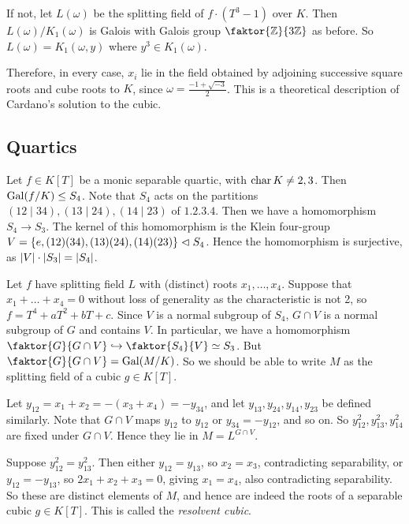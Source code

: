 If not, let \( L(\omega) \) be the splitting field of \( f \cdot (T^3 - 1) \) over \( K \).
Then \( L(\omega) / K_1(\omega) \) is Galois with Galois group \( \faktor{\mathbb Z}{3\mathbb Z} \) as before.
So \( L(\omega) = K_1(\omega, y) \) where \( y^3 \in K_1(\omega) \).

Therefore, in every case, \( x_i \) lie in the field obtained by adjoining successive square roots and cube roots to \( K \), since \( \omega = \frac{-1 + \sqrt{-3}}{2} \).
This is a theoretical description of Cardano's solution to the cubic.

\subsection{Quartics}
Let \( f \in K[T] \) be a monic separable quartic, with \( \operatorname{char} K \neq 2, 3 \).
Then \( \operatorname{Gal}(f/K) \leq S_4 \).
Note that \( S_4 \) acts on the partitions \( (12\mid 34), (13\mid 24), (14\mid 23) \) of \( \qty{1, 2, 3, 4} \).
Then we have a homomorphism \( S_4 \to S_3 \).
The kernel of this homomorphism is the Klein four-group \( V = \qty{e, (12)(34), (13)(24), (14)(23)} \vartriangleleft S_4 \).
Hence the homomorphism is surjective, as \( \abs{V} \cdot \abs{S_3} = \abs{S_4} \).

Let \( f \) have splitting field \( L \) with (distinct) roots \( x_1, \dots, x_4 \).
Suppose that \( x_1 + \dots + x_4 = 0 \) without loss of generality as the characteristic is not 2, so \( f = T^4 + aT^2 + bT + c \).
Since \( V \) is a normal subgroup of \( S_4 \), \( G \cap V \) is a normal subgroup of \( G \) and contains \( V \).
In particular, we have a homomorphism \( \faktor{G}{G \cap V} \hookrightarrow \faktor{S_4}{V} \simeq S_3 \).
But \( \faktor{G}{G \cap V} = \Gal(M/K) \).
So we should be able to write \( M \) as the splitting field of a cubic \( g \in K[T] \).

Let \( y_{12} = x_1 + x_2 = -(x_3 + x_4) = -y_{34} \), and let \( y_{13}, y_{24}, y_{14}, y_{23} \) be defined similarly.
Note that \( G \cap V \) maps \( y_{12} \) to \( y_{12} \) or \( y_{34} = -y_{12} \), and so on.
So \( y_{12}^2, y_{13}^2, y_{14}^2 \) are fixed under \( G \cap V \).
Hence they lie in \( M = L^{G \cap V} \).

Suppose \( y_{12}^2 = y_{13}^2 \).
Then either \( y_{12} = y_{13} \), so \( x_2 = x_3 \), contradicting separability, or \( y_{12} = -y_{13} \), so \( 2x_1 + x_2 + x_3 = 0 \), giving \( x_1 = x_4 \), also contradicting separability.
So these are distinct elements of \( M \), and hence are indeed the roots of a separable cubic \( g \in K[T] \).
This is called the \emph{resolvent cubic}.


